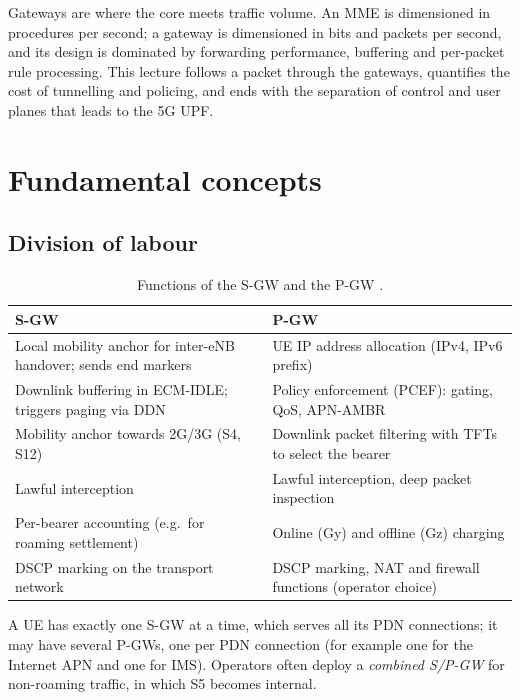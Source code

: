 \documentclass[11pt,a4paper]{article}
\begin{document}
Gateways are where the core meets traffic volume. An MME is dimensioned in procedures per second; a
gateway is dimensioned in bits and packets per second, and its design is dominated by forwarding
performance, buffering and per-packet rule processing. This lecture follows a packet through the
gateways, quantifies the cost of tunnelling and policing, and ends with the separation of control and
user planes that leads to the 5G UPF.

\section{Fundamental concepts}

\subsection{Division of labour}
\begin{table}[htbp]
\centering\small
\caption{Functions of the S-GW and the P-GW \cite{ts23401}.}\label{tab:roles}
\begin{tabularx}{\linewidth}{@{}Y Y@{}}
\toprule
{}S-GW & P-GW \\
\midrule
Local mobility anchor for inter-eNB handover; sends end markers & UE IP address allocation (IPv4, IPv6 prefix) \\
Downlink buffering in ECM-IDLE; triggers paging via DDN & Policy enforcement (PCEF): gating, QoS, APN-AMBR \\
Mobility anchor towards 2G/3G (S4, S12) & Downlink packet filtering with TFTs to select the bearer \\
Lawful interception & Lawful interception, deep packet inspection \\
Per-bearer accounting (e.g.\ for roaming settlement) & Online (Gy) and offline (Gz) charging \\
DSCP marking on the transport network & DSCP marking, NAT and firewall functions (operator choice) \\
\bottomrule
\end{tabularx}
\end{table}

A UE has exactly one S-GW at a time, which serves all its PDN connections; it may have several P-GWs,
one per PDN connection (for example one for the Internet APN and one for IMS). Operators often deploy
a \emph{combined S/P-GW} for non-roaming traffic, in which S5 becomes internal.
\end{document}
